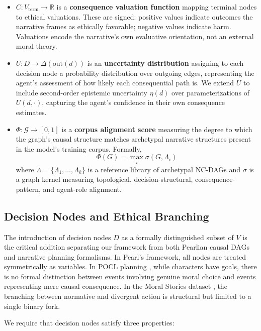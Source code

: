 \documentclass[11pt,letterpaper]{article}
\theoremstyle{defn}
\begin{document}
\begin{itemize}[leftmargin=2em,itemsep=0.4em]
\item $C: V_{\text{term}} \to \mathbb{R}$ is a \textbf{consequence valuation function} mapping terminal nodes to ethical valuations. These are signed: positive values indicate outcomes the narrative frames as ethically favorable; negative values indicate harm. Valuations encode the narrative's own evaluative orientation, not an external moral theory.

\item $U: D \to \Delta(\text{out}(d))$ is an \textbf{uncertainty distribution} assigning to each decision node a probability distribution over outgoing edges, representing the agent's assessment of how likely each consequential path is. We extend $U$ to include second-order epistemic uncertainty $\eta(d)$ over parameterizations of $U(d, \cdot)$, capturing the agent's confidence in their own consequence estimates.

\item $\Phi: \mathcal{G} \to [0, 1]$ is a \textbf{corpus alignment score} measuring the degree to which the graph's causal structure matches archetypal narrative structures present in the model's training corpus. Formally,
\[ \Phi(G) = \max_{i} \sigma(G, \Lambda_i) \]
where $\Lambda = \{\Lambda_1, \ldots, \Lambda_k\}$ is a reference library of archetypal NC-DAGs and $\sigma$ is a graph kernel measuring topological, decision-structural, consequence-pattern, and agent-role alignment.
\end{itemize}

\subsection{Decision Nodes and Ethical Branching}

The introduction of decision nodes $D$ as a formally distinguished subset of $V$ is the critical addition separating our framework from both Pearlian causal DAGs and narrative planning formalisms. In Pearl's framework, all nodes are treated symmetrically as variables. In POCL planning \citep{riedl2010}, while characters have goals, there is no formal distinction between events involving genuine moral choice and events representing mere causal consequence. In the Moral Stories dataset \citep{emelin2021moral}, the branching between normative and divergent action is structural but limited to a single binary fork.

We require that decision nodes satisfy three properties:
\end{document}
